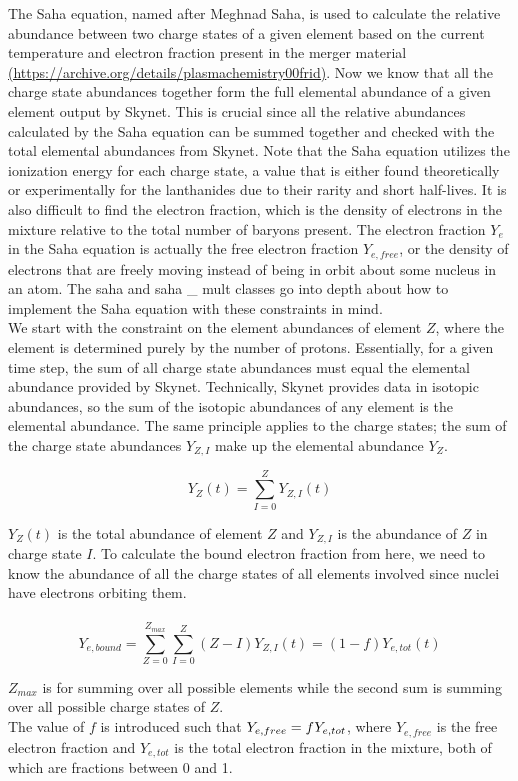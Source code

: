 \documentclass[11pt,a4paper]{article}
\begin{document}
The Saha equation, named after Meghnad Saha, is used to calculate the relative abundance between two charge states of a given element based on the current temperature and electron fraction present in the merger material \url{(https://archive.org/details/plasmachemistry00frid)}. Now we know that all the charge state abundances together form the full elemental abundance of a given element output by Skynet. This is crucial since all the relative abundances calculated by the Saha equation can be summed together and checked with the total elemental abundances from Skynet. Note that the Saha equation utilizes the ionization energy for each charge state, a value that is either found theoretically or experimentally for the lanthanides due to their rarity and short half-lives. It is also difficult to find the electron fraction, which is the density of electrons in the mixture relative to the total number of baryons present. The electron fraction $Y_e$ in the Saha equation is actually the free electron fraction $Y_{e,free}$, or the density of electrons that are freely moving instead of being in orbit about some nucleus in an atom. The saha and saha \_ mult classes go into depth about how to implement the Saha equation with these constraints in mind.  \\



We start with the constraint on the element abundances of element $Z$, where the element is determined purely by the number of protons. Essentially, for a given time step, the sum of all charge state abundances must equal the elemental abundance provided by Skynet. Technically, Skynet provides data in isotopic abundances, so the sum of the isotopic abundances of any element is the elemental abundance. The same principle applies to the charge states; the sum of the charge state abundances $Y_{Z,I}$ make up the elemental abundance $Y_Z$.

$$Y_Z (t) = \sum_{I=0}^{Z} Y_{Z,I}(t)$$

$Y_Z (t)$ is the total abundance of element $Z$ and $Y_{Z,I}$ is the abundance of $Z$ in charge state $I$. To calculate the bound electron fraction from here, we need to know the abundance of all the charge states of all elements involved since nuclei have electrons orbiting them. 
\\\\
$$Y_{e,bound} = \sum_{Z=0}^{Z_{max}} \sum_{I=0}^{Z} (Z - I) Y_{Z,I}(t) = (1-f) Y_{e,tot}(t) $$

$Z_{max}$ is for summing over all possible elements while the second sum is summing over all possible charge states of $Z$. 
\\The value of $f$ is introduced such that $Y_{e,free} = f \hspace{.1mm} Y_{e,tot}$, where $Y_{e,free}$ is the free electron fraction and $Y_{e,tot}$ is the total electron fraction in the mixture, both of which are fractions between 0 and 1. \\
\end{document}
